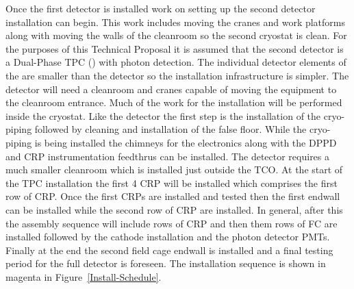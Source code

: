 Once the first detector is installed work on setting up the second
detector installation can begin. This work includes moving the cranes
and work platforms along with moving the walls of the cleanroom so the
second cryostat is clean. For the purposes of this Technical Proposal
it is assumed that the second detector is a Dual-Phase TPC
() with photon detection. The individual detector elements
of the  are smaller than the  detector so the
installation infrastructure is simpler. The  detector will
need a cleanroom and cranes capable of moving the equipment to the
cleanroom entrance. Much of the work for the  installation
will be performed inside the cryostat. Like the  detector
the first step is the installation of the cryo-piping followed by
cleaning and installation of the false floor. While the cryo-piping is
being installed the  chimneys for the electronics along with
the DPPD and CRP instrumentation feedthrus can be installed. The
 detector requires a much smaller cleanroom which is
installed just outside the TCO. At the start of the TPC installation
the first \num{4} CRP will be installed which comprises the first row of
CRP. Once the first CRPs are installed and tested then the first
endwall can be installed while the second row of CRP are installed. In
general, after this the assembly sequence will include rows of CRP and
then them rows of FC are installed followed by the cathode
installation and the photon detector PMTs. Finally at the end the
second field cage endwall is installed and a final testing period for
the full detector is foreseen. The  installation sequence is
shown in magenta in Figure~\ref{Install-Schedule}.

